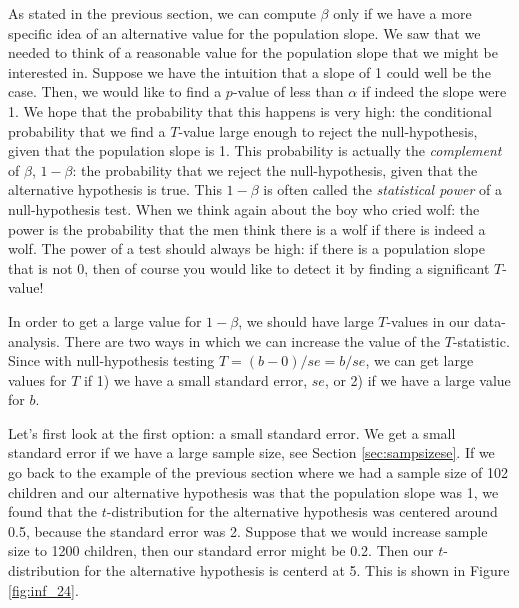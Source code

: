 \documentclass[]{book}\usepackage[]{graphicx}\usepackage[]{color}
\begin{document}
As stated in the previous section, we can compute $\beta$ only if we have a more specific idea of an alternative value for the population slope. We saw that we needed to think of a reasonable value for the population slope that we might be interested in. Suppose we have the intuition that a slope of 1 could well be the case. Then, we would like to find a $p$-value of less than $\alpha$ if indeed the slope were 1. We hope that the probability that this happens is very high: the conditional probability that we find a $T$-value large enough to reject the null-hypothesis, given that the population slope is 1. This probability is actually the \textit{complement} of $\beta$, $1-\beta$: the probability that we reject the null-hypothesis, given that the alternative hypothesis is true. This $1-\beta$ is often called the \textit{statistical power} of a null-hypothesis test. When we think again about the boy who cried wolf: the power is the probability that the men think there is a wolf if there is indeed a wolf. The power of a test should always be high: if there is a population slope that is not 0, then of course you would like to detect it by finding a significant $T$-value!

In order to get a large value for $1-\beta$, we should have large $T$-values in our data-analysis. There are two ways in which we can increase the value of the $T$-statistic. Since with null-hypothesis testing $T=(b-0)/se=b/se$, we can get large values for $T$ if 1) we have a small standard error, $se$, or 2) if we have a large value for $b$. 


Let's first look at the first option: a small standard error. We get a small standard error if we have a large sample size, see Section \ref{sec:sampsizese}. If we go back to the example of the previous section where we had a sample size of 102 children and our alternative hypothesis was that the population slope was 1, we found that the $t$-distribution for the alternative hypothesis was centered around 0.5, because the standard error was 2. Suppose that we would increase sample size to 1200 children, then our standard error might be 0.2. Then our $t$-distribution for the alternative hypothesis is centerd at 5. This is shown in Figure \ref{fig:inf_24}.
\end{document}
